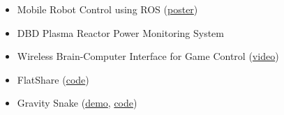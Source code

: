 \documentclass[11pt, a4paper]{article}
\providecommand{\tightlist}{%
  \setlength{\itemsep}{0pt}\setlength{\parskip}{0pt}}
\begin{document}
\begin{raggedright}
\begin{itemize}
\tightlist
\item
  Mobile Robot Control using ROS
  (\href{./assets/images/fyp.png}{poster})
\item
  DBD Plasma Reactor Power Monitoring System
\item
  Wireless Brain-Computer Interface for Game Control
  (\href{https://www.youtube.com/watch?v=ysmLmQ8NfEY}{video})
\item
  FlatShare (\href{https://github.com/xukai92/flatshare}{code})
\item
  Gravity Snake (\href{http://xuk.ai/gravity_snake/}{demo},
  \href{https://github.com/xukai92/gravity_snake}{code})
\end{itemize}
\end{raggedright}
\end{document}
